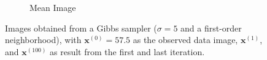 \begin{figure}[!h]
\begin{subfigure}[b]{0.24\textwidth}
            \caption[]%
            {{\small Mean Image}}    
            \label{fig:5755d1mean}
        \end{subfigure}
        \caption[]
        {\small Images obtained from a Gibbs sampler ($\sigma=5$ and a first-order neighborhood), with $\mathbf{x}^{(0)}=57.5$ as the observed data image, $\mathbf{x}^{(1)}$, and $\mathbf{x}^{(100)}$ as result from the first and last iteration. }
        \label{fig:5755d1}
    \end{figure}